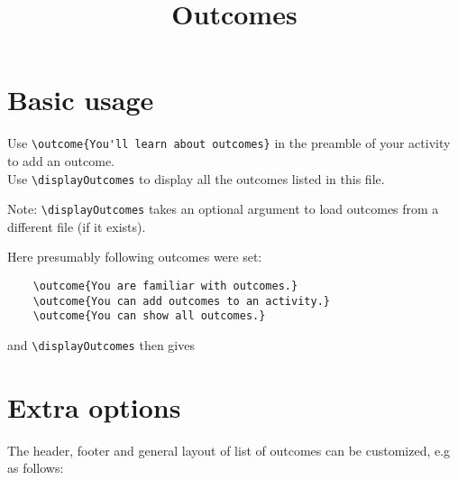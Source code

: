 \documentclass{ximera}
\title{Outcomes}
\begin{document}
\begin{abstract}
\end{abstract}
\maketitle

\section{Basic usage}

Use \verb|\outcome{You'll learn about outcomes}| in the preamble of your activity to add an outcome.
\\
Use \verb|\displayOutcomes| to display all the outcomes listed in this file.

Note: \verb|\displayOutcomes| takes an optional argument to load outcomes from a different file (if it exists).

Here presumably following outcomes were set:

\begin{verbatim}
    \outcome{You are familiar with outcomes.}
    \outcome{You can add outcomes to an activity.}
    \outcome{You can show all outcomes.}
\end{verbatim}

and \verb|\displayOutcomes| then gives 

\displayOutcomes


\section{Extra options}

The header, footer and general layout of list of outcomes can be customized, e.g as follows:

\renewcommand{\outcomeHeader}{outcomeHeader}
\renewcommand{\preOutcomeBlock}{\protect preOutputBlock \begin{itemize}}
\renewcommand{\postOutcomeBlock}{\end{itemize} postOutputBlock}

 \displayOutcomes
\end{document}
